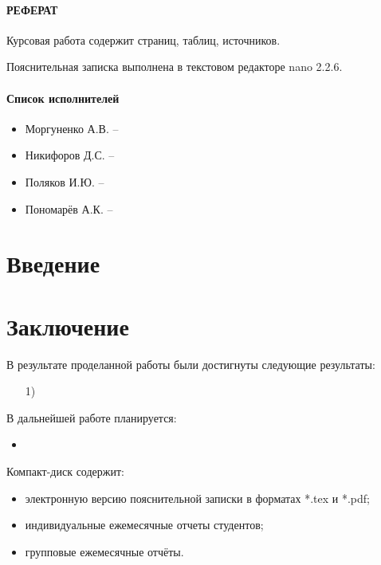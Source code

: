 \documentclass[russian,utf8,14pt,simple]{eskdtext}
\begin{document}
\newpage
{}
\paragraph{\hfill РЕФЕРАТ \hfill}
Курсовая работа содержит  страниц,  таблиц,  источников.

Пояснительная записка выполнена в текстовом редакторе nano 2.2.6.

\newpage
{}
\paragraph{\hfill Список исполнителей \hfill}
\begin{itemize}
\item Моргуненко А.В. --
\item Никифоров Д.С. -- 
\item Поляков И.Ю. --
\item Пономарёв А.К. --
\end{itemize}

\newpage
{}
\renewcommand\contentsname{\hfill Содержание \hfill}
\tableofcontents

\newpage
{}
\section{Введение}

\newpage
\section{}
\subsection{}

\section{Заключение}
В результате проделанной работы были достигнуты следующие результаты:
\begin{enumerate}
\item[1)]
\end{enumerate}

В дальнейшей работе планируется:
\begin{itemize}
\item
\end{itemize}

\newpage
\renewcommand{\refname}{Список использованных источников}


Компакт-диск содержит: 
\begin{itemize}
\item электронную версию пояснительной записки в форматах *.tex и *.pdf;
\item индивидуальные ежемесячные отчеты студентов;
\item групповые ежемесячные отчёты.
\end{itemize}
\end{document}
